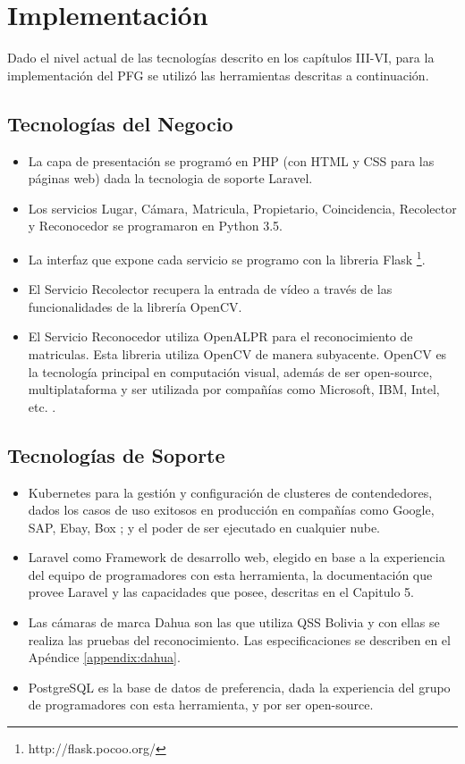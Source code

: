 \chapter{Implementación}
Dado el nivel actual de las tecnologías descrito en los capítulos III-VI, para la implementación del PFG se utilizó las herramientas descritas a continuación.

\section{Tecnologías del Negocio}
\begin{itemize}
    \item La capa de presentación se programó en PHP (con HTML y CSS para las páginas web) dada la tecnologia de soporte Laravel.
    \item Los servicios Lugar, Cámara, Matricula, Propietario, Coincidencia, Recolector y Reconocedor se programaron en Python 3.5. 
    \item La interfaz que expone cada servicio se programo con la libreria Flask
     \footnote{http://flask.pocoo.org/}.
    \item El Servicio Recolector recupera la entrada de vídeo a través de las funcionalidades de la librería OpenCV.
    \item El Servicio Reconocedor utiliza OpenALPR para el reconocimiento de matriculas. Esta libreria utiliza OpenCV de manera subyacente. OpenCV es la tecnología principal en computación visual, además de ser open-source, multiplataforma y ser utilizada por compañías como Microsoft, IBM, Intel, etc. \cite{Itseez2000-he}.       
\end{itemize}

\section{Tecnologías de Soporte}
\begin{itemize}
    \item Kubernetes para la gestión y configuración de clusteres de contendedores, dados los casos de uso exitosos en producción en compañías como Google, SAP, Ebay, Box \cite{Kubernetes2016-ub}; y el poder de ser ejecutado en cualquier nube.
    
    \item Laravel como Framework de desarrollo web, elegido en base a la experiencia del equipo de programadores con esta herramienta, la documentación que provee Laravel y las capacidades que posee, descritas en el Capitulo 5.
        
    \item Las cámaras de marca Dahua son las que utiliza QSS Bolivia y con ellas se realiza las pruebas del reconocimiento. Las especificaciones se describen en el Apéndice \ref{appendix:dahua}.

    \item PostgreSQL es la base de datos de preferencia, dada la experiencia del grupo de programadores con esta herramienta, y por ser open-source.
\end{itemize}

